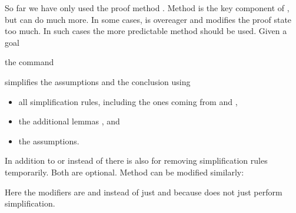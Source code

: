 \begin{isabellebody}
\begin{isamarkuptext}
So far we have only used the proof method .  Method 
is the key component of , but  can do much more. In
some cases,  is overeager and modifies the proof state too much.
In such cases the more predictable  method should be used.
Given a goal
\begin{quote}
\end{quote}
the command
\begin{quote}
\end{quote}
simplifies the assumptions  and the conclusion  using
\begin{itemize}
\item all simplification rules, including the ones coming from  and ,
\item the additional lemmas , and
\item the assumptions.
\end{itemize}
In addition to or instead of  there is also  for removing
simplification rules temporarily. Both are optional. Method 
can be modified similarly:
\begin{quote}
\end{quote}
Here the modifiers are  and 
instead of just  and  because 
does not just perform simplification.


\end{isamarkuptext}
\end{isabellebody}
